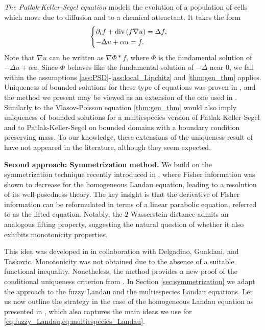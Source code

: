 \documentclass[10pt,oneside]{amsart}
\numberwithin{equation}{section}
\numberwithin{definition}{section}
\numberwithin{theorem}{section}
\numberwithin{lemma}{section}
\begin{document}
\textit{The Patlak-Keller-Segel equation} models the evolution of a population of cells which move due to diffusion and to a chemical attractant. It takes the form
%
\begin{equation*}
  \begin{cases}
  \partial_{t}f+\textnormal{div}\left(f\nabla u\right)=\Delta f,\\
  -\Delta u+\alpha u=f.
  \end{cases}
\end{equation*}
%
Note that $\nabla u$ can be written as $\nabla \Phi * f$, where $\Phi$ is the fundamental solution of $-\Delta u+\alpha u$. Since $\Phi$ behaves like the fundamental solution of $-\Delta$ near $0$, we fall within the assumptions \ref{ass:PSD}-\ref{ass:local_Lipchitz} and \cref{thm:gen_thm} applies. Uniqueness of bounded solutions for these type of equations was proven in \cite{carrillo2012uniquenessKS}, and the method we present may be viewed as an extension of the one used in \cite{carrillo2012uniquenessKS}. Similarly to the Vlasov-Poisson equation \cref{thm:gen_thm} would also imply uniqueness of bounded solutions for a multiespecies version of Patlak-Keller-Segel and to Patlak-Keller-Segel on bounded domains with a boundary condition preserving mass. To our knowledge, these extensions of the uniqueness result of \cite{carrillo2012uniquenessKS} have not appeared in the literature, although they seem expected.

\textbf{Second approach: Symmetrization method.} We build on the symmetrization technique recently introduced in \cite{GS24}, where Fisher information was shown to decrease for the homogeneous Landau equation, leading to a resolution of its well-posedness theory. The key insight is that the derivative of Fisher information can be reformulated in terms of a linear parabolic equation, referred to as the lifted equation. Notably, the $2$-Wasserstein distance admits an analogous lifting property, suggesting the natural question of whether it also exhibits monotonicity properties.

This idea was developed in \cite{paper1} in collaboration with Delgadino, Gualdani, and Taskovic. Monotonicity was not obtained due to the absence of a suitable functional inequality. Nonetheless, the method provides a new proof of the conditional uniqueness criterion from \cite{fournier2009well_posedness_soft_potentials,fournier2010uniqueness_Coulomb}. In Section \ref{sec:symmetrization} we adapt the approach to the fuzzy Landau and the multiespecies Landau equations. Let us now outline the strategy in the case of the homogeneous Landau equation as presented in \cite{paper1}, which also captures the main ideas we use for \cref{eq:fuzzy_Landau,eq:multiespecies_Landau}.
\end{document}
